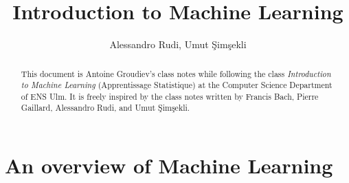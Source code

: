 \documentclass[toc, titlepaged]{../cs-classes/cs-classes}
\title{Introduction to Machine Learning}
\author{Alessandro Rudi, Umut \c{S}im\c{s}ekli}
\begin{document}
\begin{abstract}
    This document is Antoine Groudiev's class notes while following the class \emph{Introduction to Machine Learning} (Apprentissage Statistique) at the Computer Science Department of ENS Ulm. It is freely inspired by the class notes written by Francis Bach, Pierre Gaillard, Alessandro Rudi, and Umut \c{S}im\c{s}ekli. 
\end{abstract}

\section{An overview of Machine Learning}
%
%
%
\end{document}
